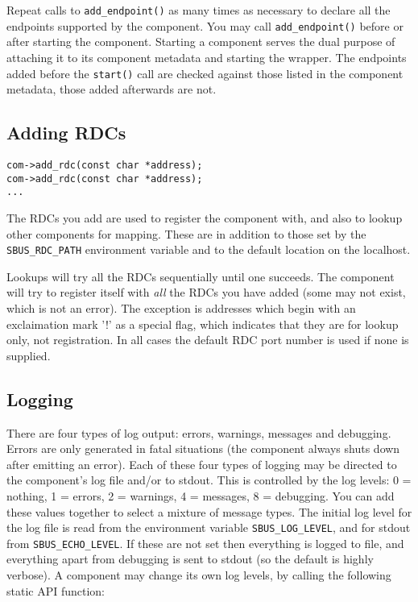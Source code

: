 \documentclass[12pt,a4paper,twoside]{article}
\renewcommand{\_}{\texttt{\symbol{95}}}
\begin{document}
Repeat calls to \verb^add_endpoint()^ as many times as necessary
to declare all the endpoints supported by the component.
You may call \verb^add_endpoint()^ before or after starting the
component.
Starting a component serves the dual purpose of attaching it to
its component metadata and starting the wrapper.
The endpoints added before the \verb^start()^ call
are checked against those listed in the component metadata,
those added afterwards are not.

\subsection{Adding RDCs}

\begin{verbatim}
com->add_rdc(const char *address);
com->add_rdc(const char *address);
...
\end{verbatim}

The RDCs you add are used to register the component with, and also to
lookup other components for mapping. These are in addition to those
set by the \verb^SBUS_RDC_PATH^ environment variable and to the
default location on the localhost.

Lookups will try all the RDCs sequentially until one succeeds.
The component will try to register itself with \textit{all}
the RDCs you have added (some may not exist, which is not an error).
The exception is addresses which begin with an exclaimation mark '!'
as a special flag, which indicates that they are for lookup only,
not registration.
In all cases the default RDC port number is used if none is supplied.

\subsection{Logging}

There are four types of log output: errors, warnings, messages and
debugging. Errors are only generated in fatal situations (the
component always shuts down after emitting an error). Each of
these four types of logging may be directed to the component's
log file and/or to stdout. This is controlled by the log levels:
0 = nothing, 1 = errors, 2 = warnings, 4 = messages, 8 = debugging.
You can add these values together to select a mixture of message types.
The initial log level for the log file is read from the environment
variable \verb^SBUS_LOG_LEVEL^, and for stdout from \verb^SBUS_ECHO_LEVEL^.
If these are not set then everything is logged to file, and everything apart
from debugging is sent to stdout (so the default is highly verbose).
A component may change its own log levels, by calling the following
static API function:
\end{document}
